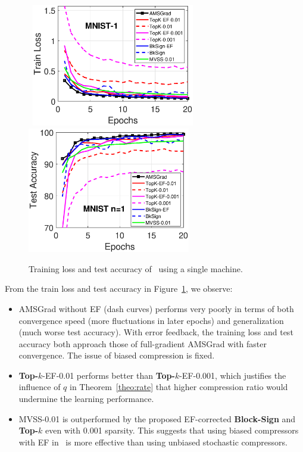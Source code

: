 \documentclass[11pt]{article}
\begin{document}
\begin{figure}[H]
    \begin{center}
    \mbox{\hspace{-0.1in}
        \includegraphics[width=2.8in]{fig/mnist_cnn_train_loss_1_Qadamsign.eps}\hspace{-0.1in}
        \includegraphics[width=2.8in]{fig/mnist_cnn_test_accuracy_1_Qadamsign.eps}
    }
    \end{center}
	\caption{Training loss and test accuracy of \algo\ using a single machine.}
	\label{fig:mnist-1}
\end{figure}

From the train loss and test accuracy in Figure~\ref{fig:mnist-1}, we observe:
\begin{itemize}
    \item AMSGrad without EF (dash curves) performs very poorly in terms of both convergence speed (more fluctuations in later epochs) and generalization (much worse test accuracy). With error feedback, the training loss and test accuracy both approach those of full-gradient AMSGrad with faster convergence. The issue of biased compression is fixed.
    
    \item \textbf{Top-$k$}-EF-0.01 performs better than \textbf{Top-$k$}-EF-0.001, which justifies the influence of $q$ in Theorem~\ref{theo:rate} that higher compression ratio would undermine the learning performance.
    
    \item MVSS-0.01 is outperformed by the proposed EF-corrected \textbf{Block-Sign} and \textbf{Top-$k$} even with 0.001 sparsity. This suggests that using biased compressors with EF in \algo\ is more effective than using unbiased stochastic compressors.
\end{itemize}
\end{document}

